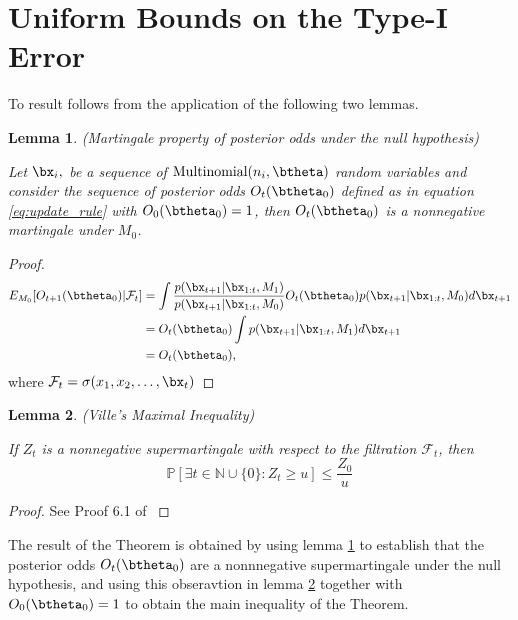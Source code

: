 \documentclass[11pt]{article}
\newtheorem{lemma}{Lemma}[section]
\begin{document}
\section{Uniform Bounds on the Type-I Error}
\label{app:type_1_error}
To result follows from the application of the following two lemmas.
\begin{lemma}(Martingale property of posterior odds under the null hypothesis)
  
  \noindent Let $\bx_i,$ be a sequence of $\text{Multinomial}(n_i,\btheta)$ random variables and consider the sequence of posterior odds $O_t(\btheta_0)$ defined as in equation \eqref{eq:update_rule} with $O_0(\btheta_0)=1$, then $O_t(\btheta_0)$ is a nonnegative martingale under $M_0$.
  \label{lem:posterior_odds_martingale}
    \end{lemma}
  \begin{proof}
  \begin{align*}
    E_{M_0}[O_{t+1}(\btheta_0)|\mathcal{F}_t]  &= \int \frac{p(\bx_{t+1}|\bx_{1:t},M_1)}{p(\bx_{t+1}|\bx_{1:t},M_0)} O_{t}(\btheta_0) p(\bx_{t+1}|\bx_{1:t},M_0) d\bx_{t+1}\\
    &=  O_{t}(\btheta_0) \int p(\bx_{t+1}|\bx_{1:t},M_1) d\bx_{t+1}\\
    &=  O_{t}(\btheta_0),
  \end{align*}
  where $\mathcal{F}_{t} = \sigma(x_1,x_2,\dots, \bx_t)$
\end{proof}

\begin{lemma}(Ville's Maximal Inequality)
  
\label{lem:durrett}
  \noindent If $Z_{t}$ is a nonnegative supermartingale with respect to the filtration $\mathcal{F}_t$, then
  \begin{equation}
    \label{eq:durrett}
    \mathbb{P}[\exists t \in \mathbb{N}\cup \lbrace 0 \rbrace : Z_t \geq u] \leq \frac{Z_0}{u}
  \end{equation}
\end{lemma}
\begin{proof}
  See Proof 6.1 of \cite{howard}
\end{proof}
The result of the Theorem is obtained by using lemma \ref{lem:posterior_odds_martingale} to establish that the posterior odds $O_t(\btheta_0)$ are a nonnnegative supermartingale under the null hypothesis, and using this obseravtion in lemma \ref{lem:durrett} together with  $O_0(\btheta_0) = 1$  to obtain the main inequality of the Theorem.
\end{document}
